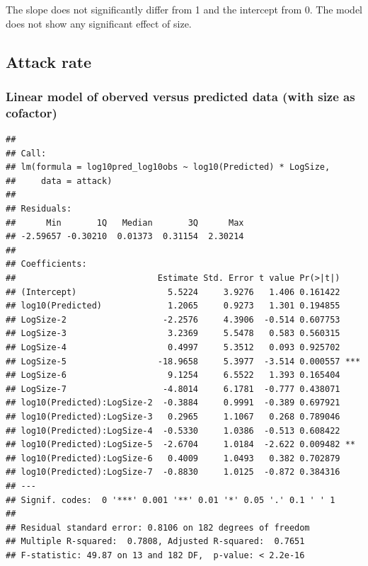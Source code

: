 The slope does not significantly differ from 1 and the intercept from 0.
The model does not show any significant effect of size.

\hypertarget{attack-rate}{%
\subsection{Attack rate}\label{attack-rate}}

\hypertarget{linear-model-of-oberved-versus-predicted-data-with-size-as-cofactor}{%
\subsubsection{Linear model of oberved versus predicted data (with size
as
cofactor)}\label{linear-model-of-oberved-versus-predicted-data-with-size-as-cofactor}}

\begin{verbatim}
## 
## Call:
## lm(formula = log10pred_log10obs ~ log10(Predicted) * LogSize, 
##     data = attack)
## 
## Residuals:
##      Min       1Q   Median       3Q      Max 
## -2.59657 -0.30210  0.01373  0.31154  2.30214 
## 
## Coefficients:
##                            Estimate Std. Error t value Pr(>|t|)    
## (Intercept)                  5.5224     3.9276   1.406 0.161422    
## log10(Predicted)             1.2065     0.9273   1.301 0.194855    
## LogSize-2                   -2.2576     4.3906  -0.514 0.607753    
## LogSize-3                    3.2369     5.5478   0.583 0.560315    
## LogSize-4                    0.4997     5.3512   0.093 0.925702    
## LogSize-5                  -18.9658     5.3977  -3.514 0.000557 ***
## LogSize-6                    9.1254     6.5522   1.393 0.165404    
## LogSize-7                   -4.8014     6.1781  -0.777 0.438071    
## log10(Predicted):LogSize-2  -0.3884     0.9991  -0.389 0.697921    
## log10(Predicted):LogSize-3   0.2965     1.1067   0.268 0.789046    
## log10(Predicted):LogSize-4  -0.5330     1.0386  -0.513 0.608422    
## log10(Predicted):LogSize-5  -2.6704     1.0184  -2.622 0.009482 ** 
## log10(Predicted):LogSize-6   0.4009     1.0493   0.382 0.702879    
## log10(Predicted):LogSize-7  -0.8830     1.0125  -0.872 0.384316    
## ---
## Signif. codes:  0 '***' 0.001 '**' 0.01 '*' 0.05 '.' 0.1 ' ' 1
## 
## Residual standard error: 0.8106 on 182 degrees of freedom
## Multiple R-squared:  0.7808, Adjusted R-squared:  0.7651 
## F-statistic: 49.87 on 13 and 182 DF,  p-value: < 2.2e-16
\end{verbatim}

